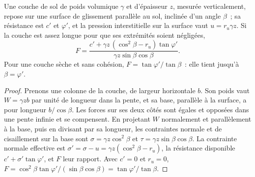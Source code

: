 \begin{proposition}\label{prop:b2:geological-hazards:infinite-slope}
Une couche de sol de poids volumique $\gamma$ et d'épaisseur $z$, mesurée verticalement,
repose sur une surface de glissement parallèle au sol, inclinée d'un angle $\beta$~;
sa résistance est $c'$ et $\varphi'$, et la pression interstitielle sur la surface vaut
$u = r_u \gamma z$. Si la couche est assez longue pour que ses extrémités soient négligées,
\begin{equation}
F = \frac{c' + \gamma z\,(\cos^2\beta - r_u)\tan\varphi'}{\gamma z \sin\beta\cos\beta}.
\label{eq:b2:geological-hazards:infinite-slope}
\end{equation}
Pour une couche sèche et sans cohésion, $F = \tan\varphi'/\tan\beta$~: elle tient jusqu'à $\beta = \varphi'$.
\end{proposition}

\begin{proof}
Prenons une colonne de la couche, de largeur horizontale $b$. Son poids vaut $W = \gamma z b$ par unité de longueur
dans la pente, et sa base, parallèle à la surface, a pour longueur $b/\cos\beta$. Les forces sur ses deux côtés
sont égales et opposées dans une pente infinie et se compensent. En projetant $W$ normalement et
parallèlement à la base, puis en divisant par sa longueur, les contraintes normale et de cisaillement sur la base sont
$\sigma = \gamma z\cos^2\beta$ et $\tau = \gamma z \sin\beta\cos\beta$. La contrainte normale effective
est $\sigma' = \sigma - u = \gamma z(\cos^2\beta - r_u)$, la résistance disponible $c' +
\sigma'\tan\varphi'$, et $F$ leur rapport. Avec $c' = 0$ et $r_u = 0$, $F = \cos^2\beta
\tan\varphi'/(\sin\beta\cos\beta) = \tan\varphi'/\tan\beta$.
\end{proof}

